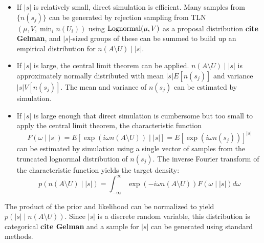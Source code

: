 \documentclass[a4paper]{article}
\begin{document}
\begin{itemize}
	\item If $|s|$ is relatively small, direct simulation is efficient. Many samples from $\{n(s_j)\}$ can be generated by rejection sampling from TLN$(\mu,V,\min_i n(U_i))$ using $\textup{Lognormal}(\mu,V)$ as a proposal distribution \textbf{cite Gelman}, and $|s|$-sized groups of these can be summed to build up an empirical distribution for $n(A\setminus U)\mid |s|$.
	\item If $|s|$ is large, the central limit theorem can be applied. $n(A\setminus U)\mid |s|$ is approximately normally distributed with mean $|s|E[n(s_j)]$ and variance $|s|V[n(s_j)]$. The mean and variance of $n(s_j)$ can be estimated by simulation.
	\item If $|s|$ is large enough that direct simulation is cumbersome but too small to apply the central limit theorem, the characteristic function
	\begin{equation}
		F(\omega\mid |s|)=E\left[\exp\left(i\omega n(A\setminus U)\right)\mid |s|\right] = E\left[\exp\left(i\omega n(s_j)\right)\right]^{|s|}
	\end{equation}
	can be estimated by simulation using a single vector of samples from the truncated lognormal distribution of $n(s_j)$. The inverse Fourier transform of the characteristic function yields the target density:
	\begin{equation}
		p(n(A\setminus U)\mid |s|)=\int_{-\infty}^\infty \exp(-i\omega n(A\setminus U))F(\omega\mid |s|)d\omega
	\end{equation}
\end{itemize}
The product of the prior and likelihood can be normalized to yield $p(|s|\mid n(A\setminus U))$. Since $|s|$ is a discrete random variable, this distribution is categorical \textbf{cite Gelman} and a sample for $|s|$ can be generated using standard methods.
\end{document}
